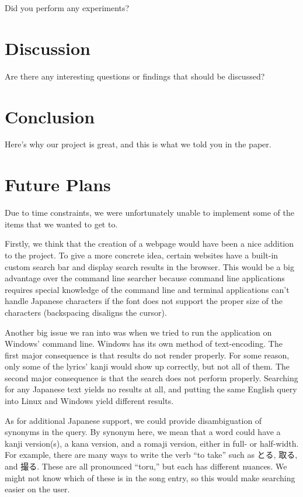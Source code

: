 \documentclass{acm} %
\begin{document}
\begin{CJK}{UTF8}{zhsong}
Did you perform any experiments?

\section{Discussion}

Are there any interesting questions or findings that should be discussed?

\section{Conclusion}

Here's why our project is great, and this is what we told you in the paper.

\section{Future Plans}

Due to time constraints, we were unfortunately unable to implement some of the items that we wanted to get to.

Firstly, we think that the creation of a webpage would have been a nice addition to the project. To give a more concrete idea, certain websites have a built-in custom search bar and display search results in the browser. This would be a big advantage over the command line searcher because command line applications requires special knowledge of the command line and terminal applications can't handle Japanese characters if the font does not support the proper size of the characters (backspacing disaligns the cursor).

Another big issue we ran into was when we tried to run the application on Windows' command line. Windows has its own method of text-encoding. The first major consequence is that results do not render properly. For some reason, only some of the lyrics' kanji would show up correctly, but not all of them. The second major consequence is that the search does not perform properly. Searching for any Japanese text yields no results at all, and putting the same English query into Linux and Windows yield different results.

As for additional Japanese support, we could provide disambiguation of synonyms in the query. By synonym here, we mean that a word could have a kanji version(s), a kana version, and a romaji version, either in full- or half-width. For example, there are many ways to write the verb ``to take'' such as とる, 取る, and 撮る. These are all pronounced ``toru,'' but each has different nuances. We might not know which of these is in the song entry, so this would make searching easier on the user.


\end{CJK}
\end{document}
